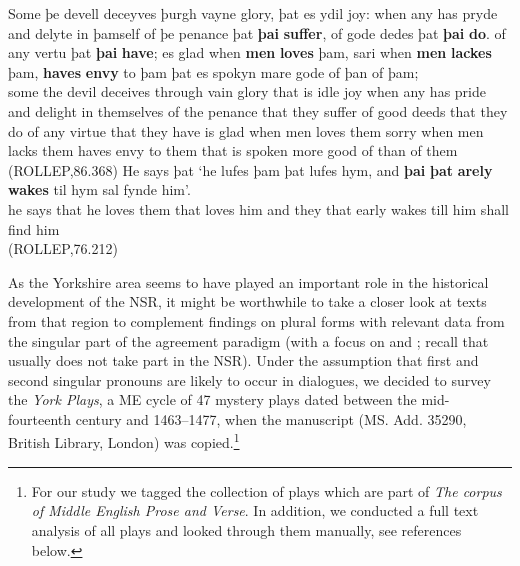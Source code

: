 \documentclass[output=paper]{langsci/langscibook}
\begin{document}
\ea
\ea
\gll Some þe devell deceyves þurgh vayne glory, þat es ydil joy: when any has pryde and delyte in þamself of þe penance þat \textbf{þai} \textbf{suffer}, of gode dedes þat \textbf{þai} \textbf{do}. of any vertu 	þat \textbf{þai} \textbf{have}; es glad when \textbf{men} \textbf{loves} þam, sari when \textbf{men} \textbf{lackes} þam, \textbf{haves} \textbf{envy} to þam þat es spokyn mare gode of þan of þam;\\
some the devil deceives through vain glory that is idle joy when any has pride and delight in themselves of the penance that they suffer of good deeds that they do of any virtue that they have is glad when men loves them sorry when men lacks them haves envy to them that is spoken more good of than of them\\
\glt (ROLLEP,86.368)
\ex
\gll He says þat `he lufes þam þat lufes hym, and \textbf{þai} \textbf{þat} \textbf{arely} \textbf{wakes} til hym sal fynde him'. \\
he says that he loves them that loves him and they that early wakes till him shall find him\\
\glt (ROLLEP,76.212)
\z
\z

As the Yorkshire area seems to have played an important role in the historical
development of the \gls{NSR}, it might be worthwhile to take a closer look at
texts from that region to complement 
findings on plural forms with relevant data from the singular part of the
agreement paradigm (with a focus on \Fsg{} and \Ssg{}; recall that \Tsg{}
usually does not take part in the \gls{NSR}). Under the assumption that first
and second singular pronouns are likely to occur in dialogues, we decided to
survey the \emph{York Plays}, a \gls{ME} cycle of 47 mystery plays dated between the
mid-fourteenth century and 1463--1477, when the manuscript (MS. Add. 35290,
British Library, London) was copied.\footnote{For our study we tagged the
    collection of plays which are part of \emph{The corpus of Middle English Prose
    and Verse}. In addition, we conducted a full text analysis of all plays and
looked through them manually, see references below.}
\end{document}
